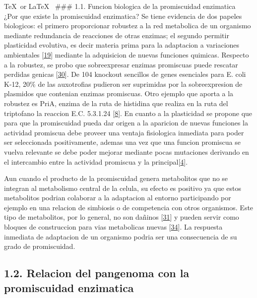 \documentclass[12pt,twoside]{reedthesis}
\begin{document}
  \TeX~or \LaTeX~ \#\#\# 1.1. Funcion biologica de la promiscuidad
  enzimatica\\
  ¿Por que existe la promiscuidad enzimatica? Se tiene evidencia de dos
  papeles biologicos: el primero proporcionar robustez a la red metabolica
  de un organismo mediante redundancia de reacciones de otras enzimas; el
  segundo permitir plasticidad evolutiva, es decir materia prima para la
  adaptacion a variaciones ambientales
  {[}\protect\hyperlink{ref-aharoniux5fevolvabilityux5f2005}{19}{]}
  mediante la adquisicion de nuevas funciones quimicas. Respecto a la
  robustez, se probo que sobreexpresar enzimas promiscuas puede rescatar
  perdidas genicas
  {[}\protect\hyperlink{ref-patrickux5fmulticopyux5f2007}{30}{]}. De 104
  knockout sencillos de genes esenciales para E. coli K-12, 20\% de las
  auxotrofias pudieron ser suprimidas por la sobreexpresion de plasmidos
  que contenian enzimas promiscuas. Otro ejemplo que aporta a la robustez
  es PriA, enzima de la ruta de histidina que realiza en la ruta del
  triptofano la reaccion E.C. 5.3.1.24
  {[}\protect\hyperlink{ref-baronagomezux5foccurrenceux5f2003}{8}{]}. En
  cuanto a la plasticidad se propone que para que la promiscuidad pueda
  dar origen a la aparicion de nuevas funciones la actividad promiscua
  debe proveer una ventaja fisiologica inmediata para poder ser
  seleccionada positivamente, ademas una vez que una funcion promiscua se
  vuelva relevante se debe poder mejorar mediante pocas mutaciones
  derivando en el intercambio entre la actividad promiscua y la
  principal{[}\protect\hyperlink{ref-khersonskyux5fenzymeux5f2010}{4}{]}.
  
  Aun cuando el producto de la promiscuidad genera metabolitos que no se
  integran al metabolismo central de la celula, su efecto es positivo ya
  que estos metabolitos podrian colaborar a la adaptacion al entorno
  participando por ejemplo en una relacion de simbiosis o de competencia
  con otros organismos. Este tipo de metabolitos, por lo general, no son
  dañinos
  {[}\protect\hyperlink{ref-notebaartux5fnetwork-levelux5f2014}{31}{]} y
  pueden servir como bloques de construccion para vias metabolicas nuevas
  {[}\protect\hyperlink{ref-maux5funconventionalux5f2013}{34}{]}. La
  respuesta inmediata de adaptacion de un organismo podria ser una
  consecuencia de su grado de promiscuidad.
  
  \subsection{1.2. Relacion del pangenoma con la promiscuidad
  enzimatica}\label{relacion-del-pangenoma-con-la-promiscuidad-enzimatica}
  
\end{document}
